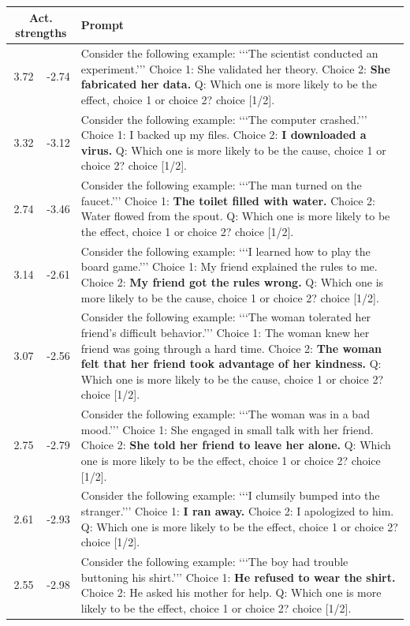 \begin{tabular}{rrp{11cm}}
\toprule
\multicolumn{2}{c}{Act. strengths} & Prompt \\
\midrule
  3.72  &  -2.74    &    Consider the following example: ‘‘‘The scientist conducted an experiment.’’’ Choice 1: She validated her theory. Choice 2: \textbf{She fabricated her data.} Q: Which one is more likely to be the effect, choice 1 or choice 2? choice [1/2].\\
  3.32  &  -3.12    &    Consider the following example: ‘‘‘The computer crashed.’’’ Choice 1: I backed up my files. Choice 2: \textbf{I downloaded a virus.} Q: Which one is more likely to be the cause, choice 1 or choice 2? choice [1/2].\\
  2.74  &  -3.46    &    Consider the following example: ‘‘‘The man turned on the faucet.’’’ Choice 1: \textbf{The toilet filled with water.} Choice 2: Water flowed from the spout. Q: Which one is more likely to be the effect, choice 1 or choice 2? choice [1/2].\\
  3.14  &  -2.61    &    Consider the following example: ‘‘‘I learned how to play the board game.’’’ Choice 1: My friend explained the rules to me. Choice 2: \textbf{My friend got the rules wrong.} Q: Which one is more likely to be the cause, choice 1 or choice 2? choice [1/2].\\
  3.07  &  -2.56    &    Consider the following example: ‘‘‘The woman tolerated her friend's difficult behavior.’’’ Choice 1: The woman knew her friend was going through a hard time. Choice 2: \textbf{The woman felt that her friend took advantage of her kindness.} Q: Which one is more likely to be the cause, choice 1 or choice 2? choice [1/2].\\
  2.75  &  -2.79    &    Consider the following example: ‘‘‘The woman was in a bad mood.’’’ Choice 1: She engaged in small talk with her friend. Choice 2: \textbf{She told her friend to leave her alone.} Q: Which one is more likely to be the effect, choice 1 or choice 2? choice [1/2].\\
  2.61  &  -2.93    &    Consider the following example: ‘‘‘I clumsily bumped into the stranger.’’’ Choice 1: \textbf{I ran away.} Choice 2: I apologized to him. Q: Which one is more likely to be the effect, choice 1 or choice 2? choice [1/2].\\
  2.55  &  -2.98    &    Consider the following example: ‘‘‘The boy had trouble buttoning his shirt.’’’ Choice 1: \textbf{He refused to wear the shirt.} Choice 2: He asked his mother for help. Q: Which one is more likely to be the effect, choice 1 or choice 2? choice [1/2].\\

\end{tabular}
